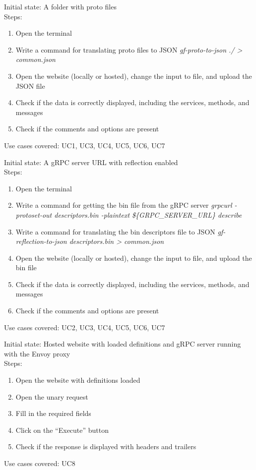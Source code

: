 Initial state: A folder with proto files\\
Steps:
\begin{enumerate}
    \item Open the terminal
    \item Write a command for translating proto files to JSON \textit{gf-proto-to-json ./ \textgreater{} common.json}
    \item Open the website (locally or hosted), change the input to file, and upload the JSON file
    \item Check if the data is correctly displayed, including the services, methods, and messages
    \item Check if the comments and options are present
\end{enumerate}
Use cases covered: UC1, UC3, UC4, UC5, UC6, UC7

Initial state: A gRPC server URL with reflection enabled\\
Steps:
\begin{enumerate}
    \item Open the terminal
    \item Write a command for getting the bin file from the gRPC server \textit{grpcurl -protoset-out descriptors.bin -plaintext \$\{GRPC\_SERVER\_URL\} describe}
    \item Write a command for translating the bin descriptors file to JSON \textit{gf-reflection-to-json descriptors.bin \textgreater{} common.json}
    \item Open the website (locally or hosted), change the input to file, and upload the bin file
    \item Check if the data is correctly displayed, including the services, methods, and messages
    \item Check if the comments and options are present
\end{enumerate}
Use cases covered: UC2, UC3, UC4, UC5, UC6, UC7

Initial state: Hosted website with loaded definitions and gRPC server running with the Envoy proxy\\
Steps:
\begin{enumerate}
    \item Open the website with definitions loaded
    \item Open the unary request
    \item Fill in the required fields
    \item Click on the \enquote{Execute} button
    \item Check if the response is displayed with headers and trailers
\end{enumerate}
Use cases covered: UC8


